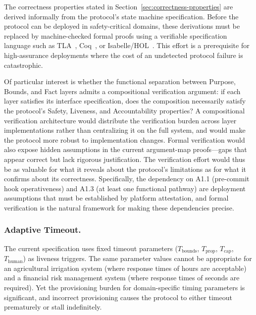 The correctness properties stated in Section~\ref{sec:correctness-properties} are derived informally from the protocol's state machine specification. Before the protocol can be deployed in safety-critical domains, these derivations must be replaced by machine-checked formal proofs using a verifiable specification language such as TLA~\cite{lamport:tla}, Coq~\cite{coq:proofassistant}, or Isabelle/HOL~\cite{abelle:proofassistant}. This effort is a prerequisite for high-assurance deployments where the cost of an undetected protocol failure is catastrophic.

Of particular interest is whether the functional separation between Purpose, Bounds, and Fact layers admits a compositional verification argument: if each layer satisfies its interface specification, does the composition necessarily satisfy the protocol's Safety, Liveness, and Accountability properties? A compositional verification architecture would distribute the verification burden across layer implementations rather than centralizing it on the full system, and would make the protocol more robust to implementation changes. Formal verification would also expose hidden assumptions in the current argument-map proofs---gaps that appear correct but lack rigorous justification. The verification effort would thus be as valuable for what it reveals about the protocol's limitations as for what it confirms about its correctness. Specifically, the dependency on A1.1 (pre-commit hook operativeness) and A1.3 (at least one functional pathway) are deployment assumptions that must be established by platform attestation, and formal verification is the natural framework for making these dependencies precise.

\subsubsection{Adaptive Timeout.}\label{sec:fw-adaptive-timeout}

The current specification uses fixed timeout parameters ($T_{\text{bounds}}$, $T_{\text{prop}}$, $T_{\text{cap}}$, $T_{\text{human}}$) as liveness triggers. The same parameter values cannot be appropriate for an agricultural irrigation system (where response times of hours are acceptable) and a financial risk management system (where response times of seconds are required). Yet the provisioning burden for domain-specific timing parameters is significant, and incorrect provisioning causes the protocol to either timeout prematurely or stall indefinitely.


